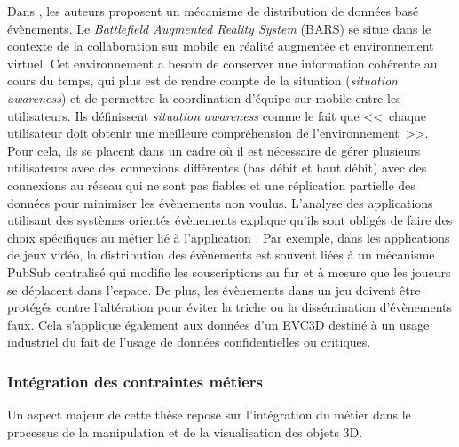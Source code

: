 %
Dans \cite{Brown2003}, les auteurs proposent un mécanisme de distribution de 
données basé évènements. Le \textit{Battlefield Augmented Reality System} 
(BARS) se situe dans le contexte de la collaboration sur mobile en réalité 
augmentée et environnement virtuel. Cet environnement a besoin de conserver 
une information cohérente au cours du temps, qui plus est de rendre compte de la 
situation (\textit{situation awareness}) et de permettre la coordination d'équipe sur 
mobile entre les utilisateurs. Ils définissent \textit{situation awareness} comme le 
fait que <<~chaque utilisateur doit obtenir une meilleure compréhension de 
l'environnement~>>. Pour cela, ils se placent dans un cadre où il est nécessaire 
de gérer plusieurs utilisateurs avec des connexions différentes (bas débit et haut 
débit) avec des connexions au réseau qui ne sont pas fiables et une réplication 
partielle des données pour minimiser les évènements non voulus.
 L'analyse des applications utilisant des systèmes orientés évènements explique 
qu'ils sont obligés de faire des choix spécifiques au métier lié à l'application 
\cite{Hinze2009}. Par exemple, dans les applications de jeux vidéo, la distribution 
des évènements est souvent liées à un mécanisme \gls{PubSub} centralisé qui 
modifie les souscriptions au fur et à mesure que les joueurs se déplacent dans 
l'espace. De plus, les évènements dans un jeu doivent être protégés contre 
l'altération pour éviter la triche ou la dissémination d'évènements faux. Cela 
s'applique également aux données d'un \gls{EVC3D} destiné à un usage industriel 
du fait de l'usage de données confidentielles ou critiques.

\subsubsection{Intégration des contraintes métiers}
Un aspect majeur de cette thèse repose sur l'intégration du métier dans le 
processus de la manipulation et de la visualisation des objets 3D.
